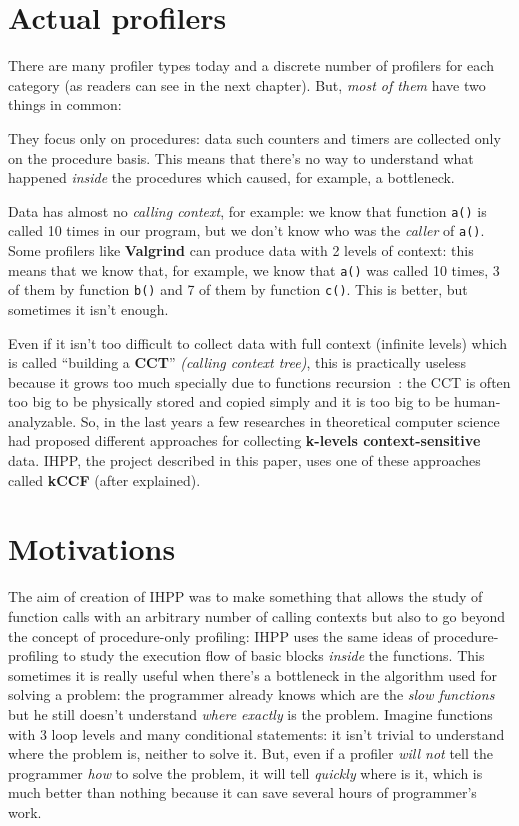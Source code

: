 \documentclass[a4paper,11pt]{report}
\begin{document}
\section{Actual profilers}

There are many profiler types today and a discrete number of profilers for
each category (as readers can see in the next chapter). But, \emph{most of them}
have two things in common:

\begin{itemize*}

\item They focus only on procedures: data such counters and timers are collected
only on the procedure basis. This means that there's no way to understand what
happened \emph{inside} the procedures which caused, for example, a bottleneck.

\item Data has almost no \emph{calling context}, for example: we know that
function \verb|a()| is called 10 times in our program, but we don't know who was
the \emph{caller} of \verb|a()|. Some profilers like \textbf{Valgrind} can
produce data with 2 levels of context: this means that we know that, for
example, we know that \verb|a()| was called 10 times, 3 of them by function
\verb|b()| and 7 of them by function \verb|c()|. This is better, but sometimes
it isn't enough.

\end{itemize*}

Even if it isn't too difficult to collect data with full context (infinite
levels) which is called ``building a \textbf{CCT}'' \emph{(calling context
tree)}, this is practically useless because it grows too much specially due to
functions recursion~\cite{kccf}: the CCT is often too big to be physically stored and copied
simply and it is too big to be human-analyzable.
So, in the last years a few researches in theoretical computer science had
proposed different approaches for collecting \textbf{k-levels context-sensitive}
data. IHPP, the project described in this paper, uses one of these approaches
called \textbf{kCCF} (after explained).

\section{Motivations}

The aim of creation of IHPP was to make something that allows the study of
function calls with an arbitrary number of calling contexts but also to go
beyond the concept of procedure-only profiling: IHPP uses the same ideas of
procedure-profiling to study the execution flow of basic blocks \emph{inside}
the functions. This sometimes it is really useful when there's a bottleneck in
the algorithm used for solving a problem: the programmer already knows which are
the \emph{slow functions} but he still doesn't understand \emph{where exactly}
is the problem. Imagine functions with 3 loop levels and many conditional
statements: it isn't trivial to understand where the problem is, neither to
solve it. But, even if a profiler \emph{will not} tell the programmer \emph{how}
to solve the problem, it will tell \emph{quickly} where is it, which is much
better than nothing because it can save several hours of programmer's work.
\end{document}
